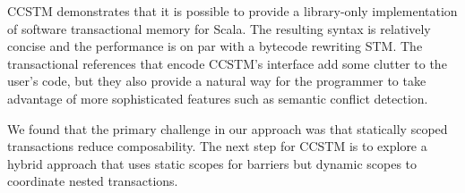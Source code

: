 
CCSTM demonstrates that it is possible to provide a library-only
implementation of software transactional memory for Scala.  The resulting
syntax is relatively concise and the performance is on par with a bytecode
rewriting STM.  The transactional references that encode CCSTM's interface
add some clutter to the user's code, but they also provide a natural way
for the programmer to take advantage of more sophisticated features such
as semantic conflict detection.

We found that the primary challenge in our approach was that statically
scoped transactions reduce composability.  The next step for CCSTM is
to explore a hybrid approach that uses static scopes for barriers but
dynamic scopes to coordinate nested transactions.

